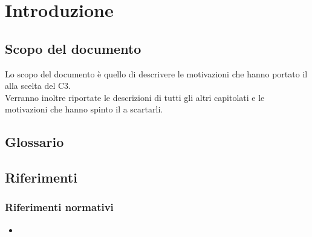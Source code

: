 

\section{Introduzione}

\subsection{Scopo del documento}

Lo scopo del documento è quello di descrivere le motivazioni che hanno portato il  alla scelta del  C3.\\
Verranno inoltre riportate le descrizioni di tutti gli altri capitolati e le motivazioni che hanno spinto il  a scartarli.



\subsection{Glossario}
\introGlossario


\subsection{Riferimenti}


\subsubsection{Riferimenti normativi}
\begin{itemize}
	\item \ndpv
\end{itemize}


